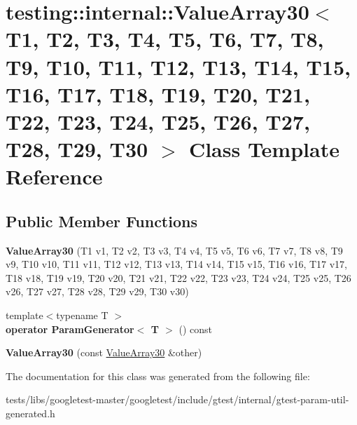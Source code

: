 \hypertarget{classtesting_1_1internal_1_1ValueArray30}{}\section{testing\+:\+:internal\+:\+:Value\+Array30$<$ T1, T2, T3, T4, T5, T6, T7, T8, T9, T10, T11, T12, T13, T14, T15, T16, T17, T18, T19, T20, T21, T22, T23, T24, T25, T26, T27, T28, T29, T30 $>$ Class Template Reference}
\label{classtesting_1_1internal_1_1ValueArray30}
\subsection*{Public Member Functions}
\begin{DoxyCompactItemize}
\item 
\mbox{\label{classtesting_1_1internal_1_1ValueArray30_a8a8f06de5be33b14b9af3593eec9ebc0}} 
{\bfseries Value\+Array30} (T1 v1, T2 v2, T3 v3, T4 v4, T5 v5, T6 v6, T7 v7, T8 v8, T9 v9, T10 v10, T11 v11, T12 v12, T13 v13, T14 v14, T15 v15, T16 v16, T17 v17, T18 v18, T19 v19, T20 v20, T21 v21, T22 v22, T23 v23, T24 v24, T25 v25, T26 v26, T27 v27, T28 v28, T29 v29, T30 v30)
\item 
\mbox{\label{classtesting_1_1internal_1_1ValueArray30_a95aea52bbac9717aedd7432f2b719f77}} 
{\footnotesize template$<$typename T $>$ }\\{\bfseries operator Param\+Generator$<$ T $>$} () const
\item 
\mbox{\label{classtesting_1_1internal_1_1ValueArray30_af27a2f6c2dea95facfbf7e2729f602c2}} 
{\bfseries Value\+Array30} (const \hyperlink{classtesting_1_1internal_1_1ValueArray30}{Value\+Array30} \&other)
\end{DoxyCompactItemize}


The documentation for this class was generated from the following file\+:\begin{DoxyCompactItemize}
\item 
tests/libs/googletest-\/master/googletest/include/gtest/internal/gtest-\/param-\/util-\/generated.\+h\end{DoxyCompactItemize}
